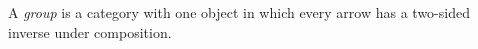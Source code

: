 A \emph{group} is a category with one object in which every arrow has a two-sided inverse under composition.
